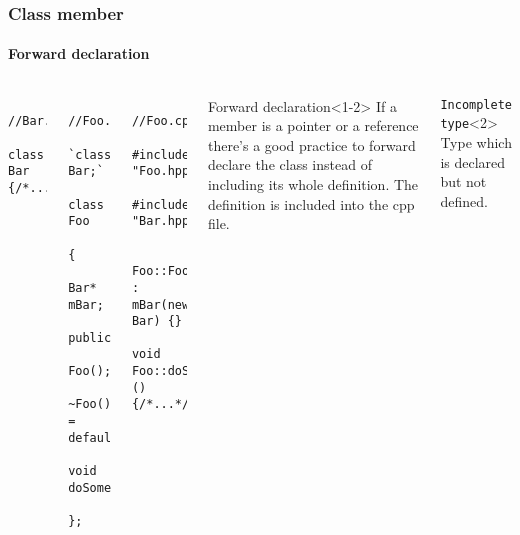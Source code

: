\documentclass{beamer}
\begin{document}
\begin{frame}[fragile]
\frametitle{Class member}
\framesubtitle{Forward declaration}
	
	\begin{columns}[t]
		\begin{lstlisting}
			//Bar.hpp
			class Bar {/*...*/};
		\end{lstlisting}
        \hrulefill
		\begin{lstlisting}
			//Foo.hpp
			`class Bar;`
			class Foo
			{
				Bar* mBar;
			public:
				Foo();
				~Foo() = default;
				void doSomething();
			};				
		\end{lstlisting}
        \hrulefill
		
		\begin{lstlisting}
            //Foo.cpp
            #include "Foo.hpp"
	 	     #include "Bar.hpp"
            
            Foo::Foo() : mBar(new Bar) {}
            void Foo::doSomething)(){/*...*/}
		\end{lstlisting}
		
		\begin{block}{Forward declaration}<1-2>
			If a member is a pointer or a reference there's a good practice to forward 
			declare the class instead of including its whole definition. 
			The definition is included into the cpp file.
		\end{block}
		\begin{block}{\texttt{Incomplete type}}<2>
            Type which is declared but not defined.
		\end{block}
	\end{columns}
\end{frame}
\end{document}
